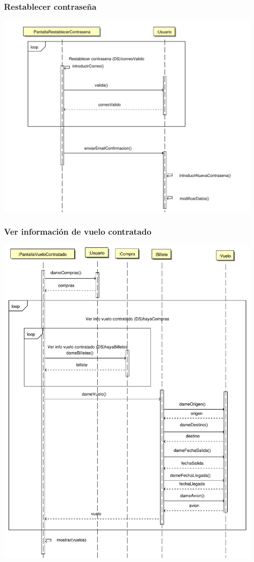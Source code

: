 \documentclass[11pt, a4paper, twoside, titlepage]{article}
\begin{document}
			\subsubsection{Restablecer contraseña}
				\begin{center}
					\includegraphics[scale=.6]{diseno/diagramas/restablecercontrasena.pdf}
				\end{center}

			\subsubsection{Ver información de vuelo contratado}
				\begin{center}
					\includegraphics[scale=.7]{diseno/diagramas/verinfovuelocontratado.pdf}
				\end{center}
			
\end{document}
